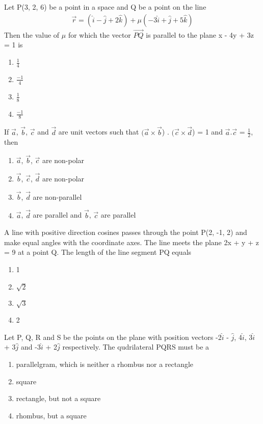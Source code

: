 \item Let P(3, 2, 6) be a point in a space and Q be a point on the line 
\begin{align*}
\overrightarrow{r} = (\hat{i} - \hat{j} + 2\hat{k}) + \mu(-3\hat{i} + \hat{j} + 5\hat{k})
\end{align*}
Then the value of $\mu$ for which the vector $\overrightarrow{PQ}$ is parallel to the plane x - 4y + 3z = 1 is
\begin{enumerate}
\item $\frac{1}{4}$
\item $\frac{-1}{4}$
\item $\frac{1}{8}$
\item $\frac{-1}{8}$
\end{enumerate}

\item If $\overrightarrow{a}$, $\overrightarrow{b}$, $\overrightarrow{c}$ and $\overrightarrow{d}$ are unit vectors such that $(\overrightarrow{a} \times \overrightarrow{b}$) . $(\overrightarrow{c} \times\overrightarrow{d}$) = 1 and $\overrightarrow{a}$.$\overrightarrow{c}$ = $\frac{1}{2}$, then
\begin{enumerate}
\item $\overrightarrow{a}$, $\overrightarrow{b}$, $\overrightarrow{c}$ are non-polar
\item $\overrightarrow{b}$, $\overrightarrow{c}$, $\overrightarrow{d}$ are non-polar
\item $\overrightarrow{b}$, $\overrightarrow{d}$ are non-parallel
\item $\overrightarrow{a}$, $\overrightarrow{d}$ are parallel and $\overrightarrow{b}$, $\overrightarrow{c}$ are parallel 
\end{enumerate}

\item A line with positive direction cosines passes through the point P(2, -1, 2) and make equal angles with the coordinate axes. The line meets the plane 2x + y + z = 9 at a point Q. The length of the line segment PQ equals
\begin{enumerate}
\item 1
\item $\sqrt{2}$
\item $\sqrt{3}$
\item 2
\end{enumerate}

\item Let P, Q, R and S be the points on the plane with position vectors -2$\hat{i}$ - $\hat{j}$, 4$\hat{i}$, 3$\hat{i}$ + 3$\hat{j}$ and -3$\hat{i}$ + 2$\hat{j}$ respectively. The qudrilateral PQRS must be a
\begin{enumerate}
\item parallelgram, which is neither a rhombus nor a rectangle
\item square
\item rectangle, but not a square
\item rhombus, but a square
\end{enumerate}

